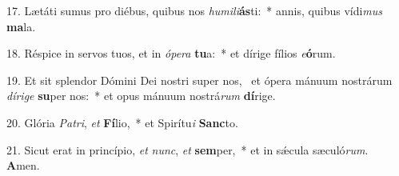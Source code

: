 17. Lætáti sumus pro diébus, quibus nos \textit{hu}\textit{mi}\textit{li}\textbf{ás}ti:~*  annis, quibus vídi\textit{mus} \textbf{ma}la.\

18. Réspice in servos tuos, et in \textit{ó}\textit{pe}\textit{ra} \textbf{tu}a:~*  et dírige fílios \textit{e}\textbf{ó}rum.\

19. Et sit splendor Dómini Dei nostri super nos, \dag\  et ópera mánuum nostrárum \textit{dí}\textit{ri}\textit{ge} \textbf{su}per nos:~*  et opus mánuum nostrá\textit{rum} \textbf{dí}rige.\

20. Glória \textit{Pa}\textit{tri}, \textit{et} \textbf{Fí}lio,~*  et Spirítu\textit{i} \textbf{Sanc}to.\

21. Sicut erat in princípio, \textit{et} \textit{nunc}, \textit{et} \textbf{sem}per,~*  et in sǽcula sæculó\textit{rum}. \textbf{A}men.\

